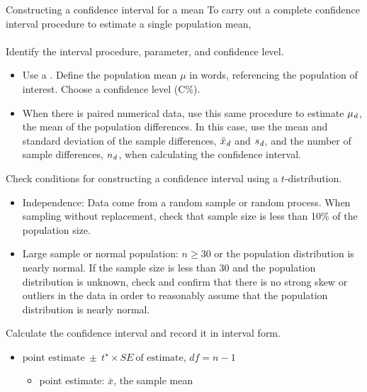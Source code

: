 \begin{onebox}{Constructing a confidence interval for a mean}
To carry out a complete confidence interval procedure to estimate a single population mean,
\\
\\
 Identify the interval procedure, parameter, and confidence level.\vspace{-1mm}
\begin{itemize}
\item [] Use a .  Define the  population mean $\mu$ in words, referencing the population of interest.  Choose a confidence level (C\%).
\item[] When there is paired numerical data, use this same procedure to estimate $\mu_{\text{\emph{d}}}$, the mean of the population differences.  In this case, use the mean and standard deviation of the sample differences, $\bar{x}_{\text{\emph{d}}}$ and $s_{\text{\emph{d}}}$, and the number of sample differences, $n_{\text{\emph{d}}}$, when calculating the confidence interval.   
\end{itemize}
 Check conditions for constructing a confidence interval using a $t$-distribution. \vspace{-1mm}
{\setlength{\leftmargini}{13mm}
\begin{itemize}
\setlength{\itemsep}{0mm} 
\item[1.] Independence:  Data come from a random sample or random process.  When sampling 
without replacement, check that sample size is less than 10\% of the population size.
\item[2.] Large sample or normal population:  $n\ge 30$ or the population distribution is nearly normal. If the sample size is less than 30 and the population distribution is unknown, check and confirm that there is no strong skew or outliers in the data in order to reasonably assume that the population distribution is nearly normal.
\end{itemize}
}
 Calculate the confidence interval and record it in interval form. 
\begin{itemize}
\item[] $\text{point estimate}\ \pm\ t^{\star} \times SE\ \text{of estimate}$, \quad $df = n - 1$
\begin{itemize}
\item[] point estimate: $\bar{x}$, the sample mean 

\end{itemize}
\end{itemize}
\end{onebox}
